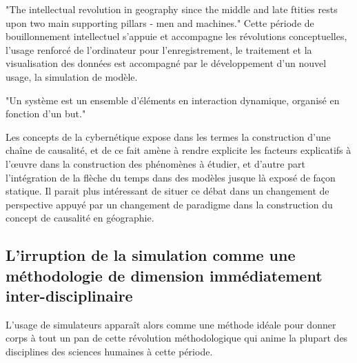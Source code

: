 "The intellectual revolution in geography since the middle and late ftities rests upon two main supporting pillars - men and machines." \autocite{Gould1970} Cette période de bouillonnement intellectuel s'appuie et accompagne les révolutions conceptuelles, l'usage renforcé de l'ordinateur pour l'enregistrement, le traitement et la visualisation des données est accompagné par le développement d'un nouvel usage, la simulation de modèle.


"Un système est un ensemble d'éléments en interaction dynamique, organisé en fonction d'un but." \autocite{Rosnay1975}

Les concepts de la cybernétique expose dans les termes la construction d'une chaîne de causalité, et de ce fait amène à rendre explicite les facteurs explicatifs à l’œuvre dans la construction des phénomènes à étudier, et d'autre part l'intégration de la flèche du temps dans des modèles jusque là exposé de façon statique. Il parait plus intéressant de situer ce débat dans un changement de perspective appuyé par un changement de paradigme dans la construction du concept de causalité en géographie. 






\subsection{L'irruption de la simulation comme une méthodologie de dimension immédiatement inter-disciplinaire}

L'usage de simulateurs apparaît alors comme une méthode idéale pour donner corps à tout un pan de cette révolution méthodologique qui anime la plupart des disciplines des sciences humaines à cette période. 

